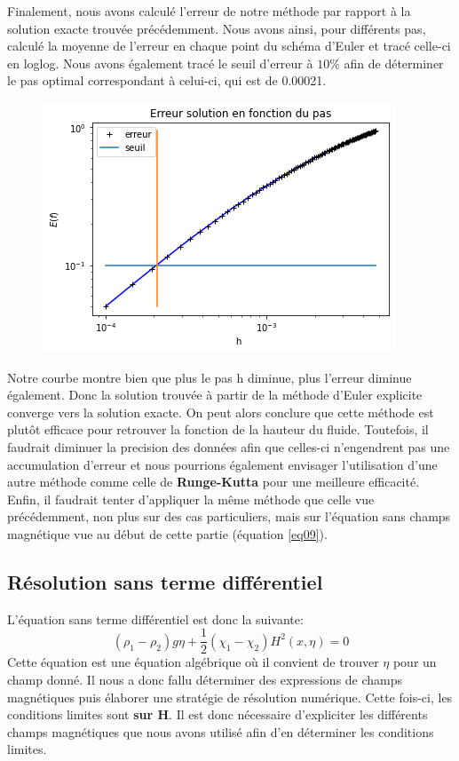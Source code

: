 \documentclass[10pt,a4paper]{article}
\begin{document}
\newpage
Finalement, nous avons calculé l'erreur de notre méthode par rapport à la solution exacte trouvée précédemment. Nous avons ainsi, pour différents pas, calculé la moyenne de l'erreur en chaque point du schéma d'Euler et tracé celle-ci en loglog. Nous avons également tracé le seuil d'erreur à $10 \%$ afin de déterminer le pas optimal correspondant à celui-ci, qui est de 0.00021.

\begin{figure}[h]
	\centering
    \includegraphics[width=.5\linewidth]{graph_Erreur.png}
    
\end{figure}

Notre courbe montre bien que plus le pas h diminue, plus l'erreur diminue également. Donc la solution trouvée à partir de la méthode d'Euler explicite converge vers la solution exacte. On peut alors conclure que cette méthode est plutôt efficace pour retrouver la fonction de la hauteur du fluide. Toutefois, il faudrait diminuer la precision des données afin que celles-ci n'engendrent pas une accumulation d'erreur et nous pourrions également envisager l'utilisation d'une autre méthode comme celle de \textbf{Runge-Kutta} pour une meilleure efficacité. Enfin, il faudrait tenter d'appliquer la même méthode que celle vue précédemment, non plus sur des cas particuliers, mais sur l'équation sans champs magnétique vue au début de cette partie (équation \ref{eq09}). 
\newline
\subsection{Résolution sans terme différentiel}
L'équation sans terme différentiel est donc la suivante:
\begin{equation}
(\rho_{1} - \rho_{2})g\eta + \frac{1}{2}(\chi_{1} - \chi_{2})H^{2}(x,\eta)=0
\end{equation}
Cette équation est une équation algébrique où il convient de trouver $\eta$ pour un champ donné. Il nous a donc fallu déterminer des expressions de champs magnétiques puis élaborer une stratégie de résolution numérique. Cette fois-ci, les conditions limites sont \textbf{sur H}. Il est donc nécessaire d'expliciter les différents champs magnétiques que nous avons utilisé afin d'en déterminer les conditions limites.
\end{document}
